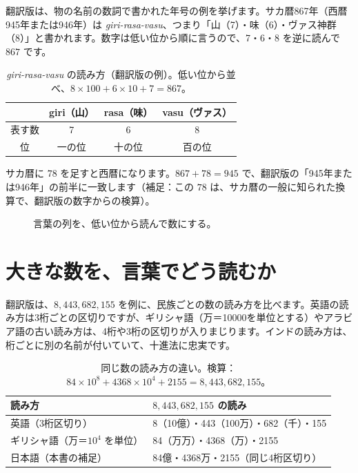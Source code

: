 \documentclass[a4paper,11pt,openany]{ltjsbook}
\begin{document}
翻訳版は、物の名前の数詞で書かれた年号の例を挙げます。サカ暦867年（西暦945年または946年）は \textit{giri-rasa-vasu}、つまり「山（7）・味（6）・ヴァス神群（8）」と書かれます。数字は低い位から順に言うので、7・6・8 を逆に読んで $867$ です。

\begin{table}[htbp]
\centering
\begin{tabular}{c|ccc}
\toprule
 & giri（山） & rasa（味） & vasu（ヴァス） \\
\midrule
表す数 & 7 & 6 & 8\\
位 & 一の位 & 十の位 & 百の位\\
\bottomrule
\end{tabular}
\caption{\textit{giri-rasa-vasu} の読み方（翻訳版の例）。低い位から並べ、$8\times100+6\times10+7=867$。}
\end{table}

サカ暦に $78$ を足すと西暦になります。$867+78=945$ で、翻訳版の「945年または946年」の前半に一致します（補足：この $78$ は、サカ暦の一般に知られた換算で、翻訳版の数字からの検算）。

\begin{figure}[htbp]
\centering
{}
\caption{言葉の列を、低い位から読んで数にする。}
\end{figure}

\section{大きな数を、言葉でどう読むか}

翻訳版は、$8{,}443{,}682{,}155$ を例に、民族ごとの数の読み方を比べます。英語の読み方は3桁ごとの区切りですが、ギリシャ語（万＝10000を単位とする）やアラビア語の古い読み方は、4桁や3桁の区切りが入りまじります。インドの読み方は、桁ごとに別の名前が付いていて、十進法に忠実です。

\begin{table}[htbp]
\centering
\begin{tabular}{lp{7.5cm}}
\toprule
読み方 & $8{,}443{,}682{,}155$ の読み\\
\midrule
英語（3桁区切り） & 8（10億）・443（100万）・682（千）・155\\
ギリシャ語（万＝$10^4$ を単位） & 84（万万）・4368（万）・2155\\
日本語（本書の補足） & 84億・4368万・2155（同じ4桁区切り）\\
\bottomrule
\end{tabular}
\caption{同じ数の読み方の違い。検算：$84\times10^{8}+4368\times10^{4}+2155=8{,}443{,}682{,}155$。}
\end{table}
\end{document}
